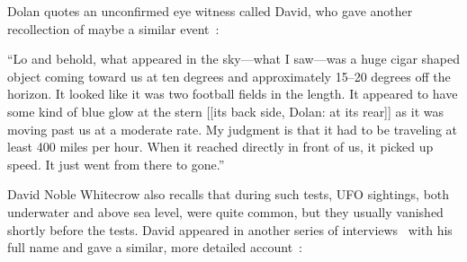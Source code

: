 Dolan quotes an unconfirmed
eye witness called David, who gave another recollection of maybe a similar event~\cite[time:~22:08 min:sec]{DolanDisclosure2020Jan}:
\begin{svgraybox}
``Lo and behold, what appeared in the sky---what I saw---was
a huge cigar shaped object coming toward us at ten degrees and approximately 15--20 degrees off the horizon.
It looked like it was two football fields in the length.
It appeared to have some kind of blue glow at the stern [[its back side, Dolan:
at its rear]]
as it was moving past us at a moderate rate.
My judgment is that it had to be traveling at least 400 miles per hour.
When it reached directly in front of us,
it picked up speed. It just went from there to gone.''
\end{svgraybox}

David Noble Whitecrow also recalls that during such tests, UFO sightings, both underwater and above sea level,
were quite common, but they usually vanished shortly before the tests.
David appeared in another series of interviews~\cite{Hein2018Dec,Hein2018Dec2} with his full name and gave a similar, more detailed account~\cite[time:~1:09:55 hour:min:sec]{Hein2018Dec}:
